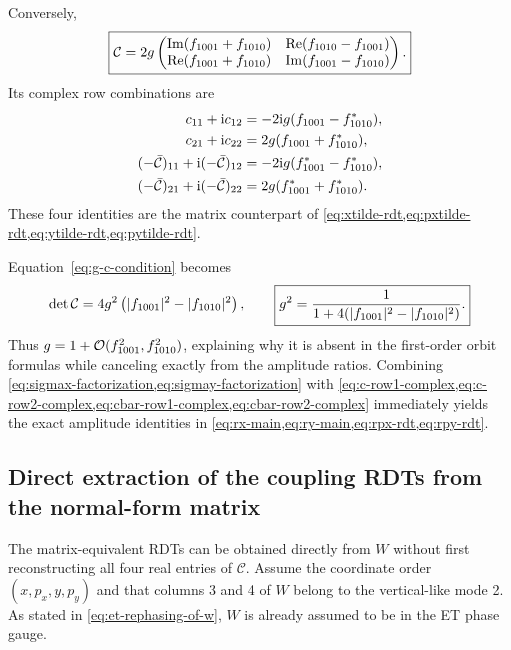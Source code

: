 Conversely,
\begin{equation}
 \boxed{
 \mathcal C=2g
 \begin{pmatrix}
  \operatorname{Im}(f_{1001}+f_{1010})&\operatorname{Re}(f_{1010}-f_{1001})\\
  \operatorname{Re}(f_{1001}+f_{1010})&\operatorname{Im}(f_{1001}-f_{1010})
 \end{pmatrix}.
 }
 \label{eq:c-from-rdts}
\end{equation}
Its complex row combinations are
\begin{align}
 c_{11}+\mathrm{i} c_{12}&=-2\mathrm{i} g(f_{1001}-f_{1010}^{*}),
 \label{eq:c-row1-complex}\\
 c_{21}+\mathrm{i} c_{22}&= 2g(f_{1001}+f_{1010}^{*}),
 \label{eq:c-row2-complex}\\
 (-\bar{\mathcal C})_{11}
 +\mathrm{i}(-\bar{\mathcal C})_{12}
 &=-2\mathrm{i} g(f_{1001}^{*}-f_{1010}^{*}),
 \label{eq:cbar-row1-complex}\\
 (-\bar{\mathcal C})_{21}
 +\mathrm{i}(-\bar{\mathcal C})_{22}
 &=2g(f_{1001}^{*}+f_{1010}^{*}).
 \label{eq:cbar-row2-complex}
\end{align}
These four identities are the matrix counterpart of \cref{eq:xtilde-rdt,eq:pxtilde-rdt,eq:ytilde-rdt,eq:pytilde-rdt}.

Equation~\eqref{eq:g-c-condition} becomes
\begin{equation}
 \det\mathcal C=4g^2\left(|f_{1001}|^2-|f_{1010}|^2\right),
 \qquad
 \boxed{
 g^2=\frac{1}{1+4(|f_{1001}|^2-|f_{1010}|^2)}.
 }
 \label{eq:g-from-rdts}
\end{equation}
Thus $g=1+\mathcal O(f_{1001}^2,f_{1010}^2)$, explaining why it is absent in the
first-order orbit formulas while canceling exactly from the amplitude ratios.
Combining \cref{eq:sigmax-factorization,eq:sigmay-factorization} with
\cref{eq:c-row1-complex,eq:c-row2-complex,eq:cbar-row1-complex,eq:cbar-row2-complex}
immediately yields the exact amplitude identities in
\cref{eq:rx-main,eq:ry-main,eq:rpx-rdt,eq:rpy-rdt}.

\subsection{Direct extraction of the coupling RDTs from the normal-form matrix}
\label{sec:direct-rdts-from-w}

The matrix-equivalent RDTs can be obtained directly from $W$ without first
reconstructing all four real entries of $\mathcal C$.  Assume the coordinate
order $(x,p_x,y,p_y)$ and that columns 3 and 4 of $W$ belong to the
vertical-like mode 2.  As stated in \cref{eq:et-rephasing-of-w}, $W$ is already
assumed to be in the ET phase gauge.

